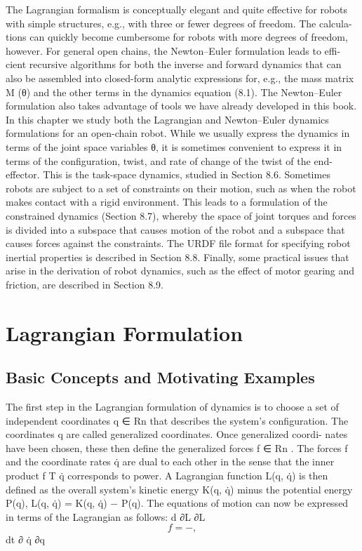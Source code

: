 \documentclass[12pt,a4paper]{article}
\begin{document}
The Lagrangian formalism is conceptually elegant and quite effective for robots
with simple structures, e.g., with three or fewer degrees of freedom. The calcula-
tions can quickly become cumbersome for robots with more degrees of freedom,
however. For general open chains, the Newton–Euler formulation leads to effi-
cient recursive algorithms for both the inverse and forward dynamics that can
also be assembled into closed-form analytic expressions for, e.g., the mass matrix
M (θ) and the other terms in the dynamics equation (8.1). The Newton–Euler
formulation also takes advantage of tools we have already developed in this
book.
    In this chapter we study both the Lagrangian and Newton–Euler dynamics
formulations for an open-chain robot. While we usually express the dynamics
in terms of the joint space variables θ, it is sometimes convenient to express it
in terms of the configuration, twist, and rate of change of the twist of the end-
effector. This is the task-space dynamics, studied in Section 8.6. Sometimes
robots are subject to a set of constraints on their motion, such as when the
robot makes contact with a rigid environment. This leads to a formulation of
the constrained dynamics (Section 8.7), whereby the space of joint torques and
forces is divided into a subspace that causes motion of the robot and a subspace
that causes forces against the constraints. The URDF file format for specifying
robot inertial properties is described in Section 8.8. Finally, some practical
issues that arise in the derivation of robot dynamics, such as the effect of motor
gearing and friction, are described in Section 8.9.

\section{Lagrangian Formulation}
\subsection{Basic Concepts and Motivating Examples}
The first step in the Lagrangian formulation of dynamics is to choose a set of
independent coordinates q ∈ Rn that describes the system’s configuration. The
coordinates q are called generalized coordinates. Once generalized coordi-
nates have been chosen, these then define the generalized forces f ∈ Rn . The
forces f and the coordinate rates q̇ are dual to each other in the sense that the
inner product f T q̇ corresponds to power. A Lagrangian function L(q, q̇) is then
defined as the overall system’s kinetic energy K(q, q̇) minus the potential energy
P(q),
                             L(q, q̇) = K(q, q̇) − P(q).
The equations of motion can now be expressed in terms of the Lagrangian as
follows:
                                 d ∂L ∂L
\begin{equation}
f=         −    ,
\label{eq:8.3}
\end{equation}
                                dt ∂ q̇   ∂q
\end{document}
